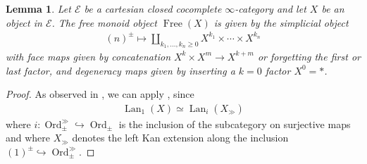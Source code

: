 \documentclass[12pt, reqno]{amsart}
\theoremstyle{plain}
\newtheorem{lemma}[theorem]{Lemma}
\theoremstyle{definition}
\begin{document}
\begin{lemma}\label{free monoid explicit}
Let $\mathcal{E}$ be a cartesian closed cocomplete $\infty$-category and let $X$ be an object in $\mathcal{E}$. The free monoid object $\operatorname{Free}(X)$ is given by the simplicial object
\begin{align*}
(n)^\pm\mapsto \coprod_{k_1,\ldots,k_n\geq 0} X^{k_1}\times \cdots \times X^{k_n}
\end{align*}
with face maps given by concatenation $X^k\times X^m\rightarrow X^{k+m}$ or forgetting the first or last factor, and degeneracy maps given by inserting a $k=0$ factor $X^0=\ast$.
\end{lemma}
\begin{proof}
As observed in , we can apply , since
\begin{align*}
\operatorname{Lan}_1(X)\simeq \operatorname{Lan}_i(X_\gg)
\end{align*}
where $i\colon \operatorname{Ord}_\pm^\gg\hookrightarrow \operatorname{Ord}_\pm$ is the inclusion of the subcategory on surjective maps and where $X_\gg$ denotes the left Kan extension along the inclusion $(1)^\pm \hookrightarrow \operatorname{Ord}_\pm^\gg$.


\end{proof}
\end{document}
